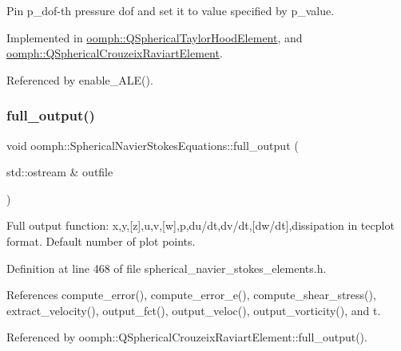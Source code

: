 Pin p\+\_\+dof-\/th pressure dof and set it to value specified by p\+\_\+value. 



Implemented in \hyperlink{classoomph_1_1QSphericalTaylorHoodElement_acc320cd97d3adae63e1775f24f63efe7}{oomph\+::\+Q\+Spherical\+Taylor\+Hood\+Element}, and \hyperlink{classoomph_1_1QSphericalCrouzeixRaviartElement_a61feca031056f09a70e1d9901d20b58b}{oomph\+::\+Q\+Spherical\+Crouzeix\+Raviart\+Element}.



Referenced by enable\+\_\+\+A\+L\+E().

\mbox{\label{classoomph_1_1SphericalNavierStokesEquations_a2dfa5e66ae9d2e0b2464e18cd9b55beb}} 
\subsubsection{\texorpdfstring{full\+\_\+output()}{full\_output()}\hspace{0.1cm}{\footnotesize\ttfamily [1/2]}}
{\footnotesize\ttfamily void oomph\+::\+Spherical\+Navier\+Stokes\+Equations\+::full\+\_\+output (\begin{DoxyParamCaption}\item[{std\+::ostream \&}]{outfile }\end{DoxyParamCaption})\hspace{0.3cm}{\ttfamily [inline]}}



Full output function\+: x,y,\mbox{[}z\mbox{]},u,v,\mbox{[}w\mbox{]},p,du/dt,dv/dt,\mbox{[}dw/dt\mbox{]},dissipation in tecplot format. Default number of plot points. 



Definition at line 468 of file spherical\+\_\+navier\+\_\+stokes\+\_\+elements.\+h.



References compute\+\_\+error(), compute\+\_\+error\+\_\+e(), compute\+\_\+shear\+\_\+stress(), extract\+\_\+velocity(), output\+\_\+fct(), output\+\_\+veloc(), output\+\_\+vorticity(), and t.



Referenced by oomph\+::\+Q\+Spherical\+Crouzeix\+Raviart\+Element\+::full\+\_\+output().


